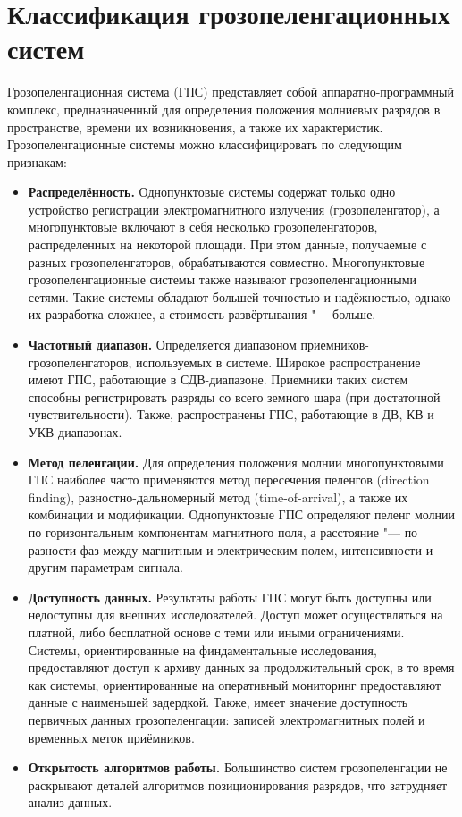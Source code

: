 \section{Классификация грозопеленгационных систем}
Грозопеленгационная система (ГПС) представляет собой ап\-па\-рат\-но-про\-грамм\-ный комплекс, предназначенный для определения положения молниевых разрядов в пространстве, времени их возникновения, а также их характеристик. Грозопеленгационные системы можно классифицировать по следующим признакам:
\begin{itemize}
	\item \textbf{Распределённость.} Однопунктовые системы содержат только одно устройство регистрации электромагнитного излучения (грозопеленгатор), а многопунктовые включают в себя несколько грозопеленгаторов, распределенных на некоторой площади. При этом данные, получаемые с разных грозопеленгаторов, обрабатываются совместно. Многопунктовые грозопеленгационные системы также называют грозопеленгационными сетями. Такие системы обладают большей точностью и надёжностью, однако их разработка сложнее, а стоимость развёртывания "--- больше.
	\item \textbf{Частотный диапазон.} Определяется диапазоном при\-ем\-ни\-ков-гро\-зо\-пе\-лен\-га\-то\-ров, используемых в системе. Широкое распространение имеют ГПС, работающие в СДВ-диапазоне. Приемники таких систем способны регистрировать разряды со всего земного шара (при достаточной чувствительности). Также, распространены ГПС, работающие в ДВ, КВ и УКВ диапазонах. 
	\item \textbf{Метод пеленгации.} Для определения положения молнии многопунктовыми ГПС наиболее часто применяются метод пересечения пеленгов (direction finding), разностно-дальномерный метод (time-of-arrival), а также их комбинации и модификации. Однопунктовые ГПС определяют пеленг молнии по горизонтальным компонентам магнитного поля, а расстояние "--- по разности фаз между магнитным и электрическим полем, интенсивности и другим параметрам сигнала.
	\item \textbf{Доступность данных.} Результаты работы ГПС могут быть доступны или недоступны для внешних исследователей. Доступ может осуществляться на платной, либо бесплатной основе с теми или иными ограничениями. Системы, ориентированные на финдаментальные исследования, предоставляют доступ к архиву данных за продолжительный срок, в то время как системы, ориентированные на оперативный мониторинг предоставляют данные с наименьшей задердкой. Также, имеет значение доступность первичных данных грозопеленгации: записей электромагнитных полей и временных меток приёмников. 
	\item \textbf{Открытость алгоритмов работы.} Большинство систем грозопеленгации не раскрывают деталей алгоритмов позиционирования разрядов, что затрудняет анализ данных.
\end{itemize}


